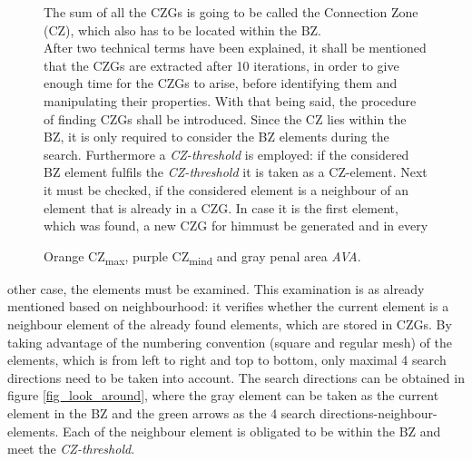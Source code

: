  \begin{figure} [!h]
 \begin{minipage}{0.45 \textwidth}
  The
      sum of all the CZGs is going to be called
      the Connection Zone (CZ), which also has
      to be located within the BZ. \\
      
             After two technical terms have 
      been explained, it shall be mentioned
      that the CZGs are extracted after 10 iterations,
      in order to give enough time for
      the CZGs to arise, before identifying them and
      manipulating their
      properties.
      With that being said,
      the procedure of finding CZGs shall be introduced.
            Since the CZ lies within the BZ, it is only required to consider the BZ elements during the search.
       Furthermore a \textit{CZ-threshold} is employed: if the
        considered BZ element fulfils the \textit{CZ-threshold} it
         is taken as a CZ-element.
         Next it must be checked, if the considered
          element is a neighbour of an element that is already in a CZG.
            In case it is the first element, which was found, a new CZG
            for himmust be generated and in every 
 \end{minipage}
 \hfill
  \begin{minipage}{0.45 \textwidth}
 \centering
 \def\svgwidth{\textwidth}
 
 \caption{Orange CZ\textsubscript{max}, purple CZ\textsubscript{mind} and
 gray penal area \emph{AVA}.}    %
 \label{fig_penal_domain}          %
 \end{minipage}
\end{figure}
 other case, the elements must be examined.
 This examination
      is 
      as already mentioned
      based on neighbourhood: it verifies whether the current element is a 
      neighbour element of the already found elements, which are stored in
      CZGs.
       By taking advantage of the numbering convention
       (square and regular mesh)
        of the elements, which is from left to right and top to bottom, only 
        maximal 4 search directions need to be taken into 
       account. The search directions can be obtained in figure \ref{fig_look_around},
       where the gray
       element can be taken as the current element in the BZ
       and the green arrows as the 4 search directions-neighbour-elements.
       Each of the neighbour element is obligated to be 
       within the BZ and  meet the \textit{CZ-threshold}.
       
